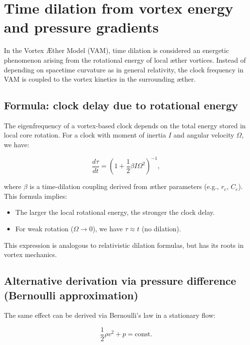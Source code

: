 \section{Time dilation from vortex energy and pressure gradients}

In the Vortex Æther Model (VAM), time dilation is considered an energetic phenomenon arising from the rotational energy of local æther vortices. Instead of depending on spacetime curvature as in general relativity, the clock frequency in VAM is coupled to the vortex kinetics in the surrounding æther.

\subsection{Formula: clock delay due to rotational energy}

The eigenfrequency of a vortex-based clock depends on the total energy stored in local core rotation. For a clock with moment of inertia $I$ and angular velocity $\Omega$, we have:

\begin{equation}
    \frac{d\tau}{dt} = \left(1 + \frac{1}{2} \beta I \Omega^2 \right)^{-1},
\end{equation}

where $\beta$ is a time-dilation coupling derived from æther parameters (e.g., $r_c$, $C_e$). This formula implies:

\begin{itemize}
    \item The larger the local rotational energy, the stronger the clock delay.
    \item For weak rotation ($\Omega \to 0$), we have $\tau \approx t$ (no dilation).
\end{itemize}

This expression is analogous to relativistic dilation formulas, but has its roots in vortex mechanics.

\subsection{Alternative derivation via pressure difference (Bernoulli approximation)}

The same effect can be derived via Bernoulli's law in a stationary flow:

\begin{equation}
    \frac{1}{2} \rho v^2 + p = \text{const.}
\end{equation}

